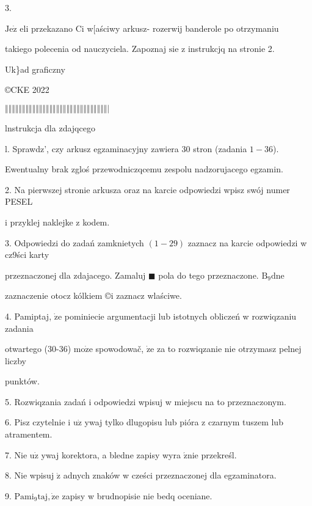 \documentclass[a4paper,12pt]{article}
\begin{document}
3.

$\mathrm{J}\mathrm{e}\dot{\mathrm{z}}$ eli przekazano Ci w[aściwy arkusz- rozerwij banderole po otrzymaniu

takiego polecenia od nauczyciela. Zapoznaj $\mathrm{s}\mathrm{i}\mathrm{e}$ z instrukcjq na stronie 2.

Uk\}ad graficzny

\copyright CKE 2022

$\Vert\Vert\Vert\Vert\Vert\Vert\Vert\Vert\Vert\Vert\Vert\Vert\Vert\Vert\Vert\Vert\Vert\Vert\Vert\Vert\Vert\Vert\Vert\Vert\Vert\Vert\Vert\Vert\Vert\Vert|$




lnstrukcja dla zdajqcego

l. Sprawdz', czy arkusz egzaminacyjny zawiera 30 stron (zadania $1-36$).

Ewentualny brak zgloś przewodniczqcemu zespolu nadzorujacego egzamin.

2. Na pierwszej stronie arkusza oraz na karcie odpowiedzi wpisz swój numer PESEL

i przyklej naklejke z kodem.

3. Odpowiedzi do zadań zamknietych $(1-29)$ zaznacz na karcie odpowiedzi w cz9ści karty

przeznaczonej dla zdajacego. Zamaluj $\blacksquare$ pola do tego przeznaczone. $\mathrm{B}_{9}\mathrm{d}\mathrm{n}\mathrm{e}$

zaznaczenie otocz kólkiem \copyright i zaznacz wlaściwe.

4. Pamiptaj, $\dot{\mathrm{z}}\mathrm{e}$ pominiecie argumentacji lub istotnych obliczeń w rozwiqzaniu zadania

otwartego (30-36) $\mathrm{m}\mathrm{o}\dot{\mathrm{z}}\mathrm{e}$ spowodowač, $\dot{\mathrm{z}}\mathrm{e}$ za to rozwiqzanie nie otrzymasz pelnej liczby

punktów.

5. Rozwiqzania zadań i odpowiedzi wpisuj w miejscu na to przeznaczonym.

6. Pisz czytelnie i $\mathrm{u}\dot{\mathrm{z}}$ ywaj tylko dlugopisu lub pióra z czarnym tuszem lub atramentem.

7. Nie $\mathrm{u}\dot{\mathrm{z}}$ ywaj korektora, a bledne zapisy wyra $\acute{\mathrm{z}}\mathrm{n}\mathrm{i}\mathrm{e}$ przekreśl.

8. Nie wpisuj $\dot{\mathrm{z}}$ adnych znaków w cześci przeznaczonej dla egzaminatora.

9. $\mathrm{P}\mathrm{a}\mathrm{m}\mathrm{i}_{9}\mathrm{t}\mathrm{a}\mathrm{j}, \dot{\mathrm{z}}\mathrm{e}$ zapisy w brudnopisie nie bedq oceniane.
\end{document}
